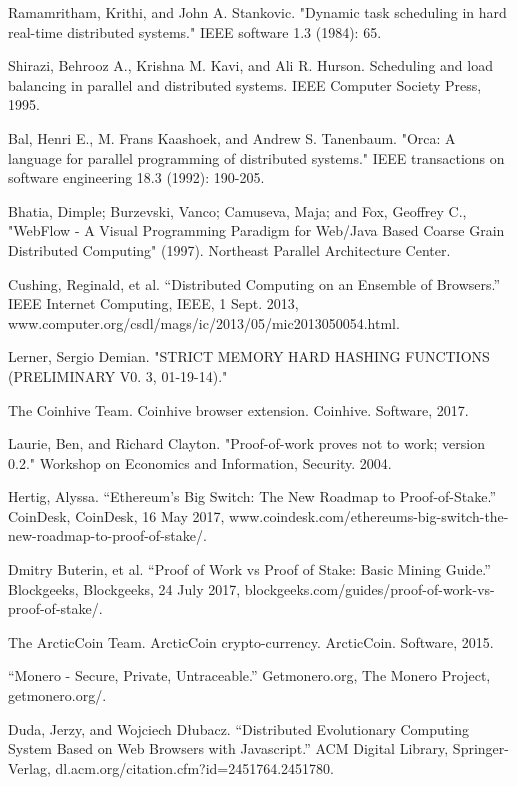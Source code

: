 \documentclass[runningheads]{llncs}
\begin{document}
\begin{thebibliography}{1}
Ramamritham, Krithi, and John A. Stankovic. "Dynamic task scheduling in hard real-time distributed systems." IEEE software 1.3 (1984): 65.

Shirazi, Behrooz A., Krishna M. Kavi, and Ali R. Hurson. Scheduling and load balancing in parallel and distributed systems. IEEE Computer Society Press, 1995.

Bal, Henri E., M. Frans Kaashoek, and Andrew S. Tanenbaum. "Orca: A language for parallel programming of distributed systems." IEEE transactions on software engineering 18.3 (1992): 190-205.

Bhatia, Dimple; Burzevski, Vanco; Camuseva, Maja; and Fox, Geoffrey C., "WebFlow - A Visual Programming Paradigm for Web/Java Based Coarse Grain Distributed Computing" (1997).
Northeast Parallel Architecture Center.

 Cushing, Reginald, et al. “Distributed Computing on an Ensemble of Browsers.” IEEE Internet Computing, IEEE, 1 Sept. 2013, www.computer.org/csdl/mags/ic/2013/05/mic2013050054.html.

 Lerner, Sergio Demian. "STRICT MEMORY HARD HASHING FUNCTIONS (PRELIMINARY V0. 3, 01-19-14)."

The Coinhive Team. Coinhive browser extension. Coinhive. Software, 2017.

Laurie, Ben, and Richard Clayton. "Proof-of-work proves not to work; version 0.2." Workshop on Economics and Information, Security. 2004.

Hertig, Alyssa. “Ethereum's Big Switch: The New Roadmap to Proof-of-Stake.” CoinDesk, CoinDesk, 16 May 2017, www.coindesk.com/ethereums-big-switch-the-new-roadmap-to-proof-of-stake/. 

Dmitry Buterin, et al. “Proof of Work vs Proof of Stake: Basic Mining Guide.” Blockgeeks, Blockgeeks, 24 July 2017, blockgeeks.com/guides/proof-of-work-vs-proof-of-stake/. 

The ArcticCoin Team. ArcticCoin crypto-currency. ArcticCoin. Software, 2015.

 “Monero - Secure, Private, Untraceable.” Getmonero.org, The Monero Project, getmonero.org/.

 Duda, Jerzy, and Wojciech Dłubacz. “Distributed Evolutionary Computing System Based on Web Browsers with Javascript.” ACM Digital Library, Springer-Verlag, dl.acm.org/citation.cfm?id=2451764.2451780.


\end{thebibliography}
\end{document}
